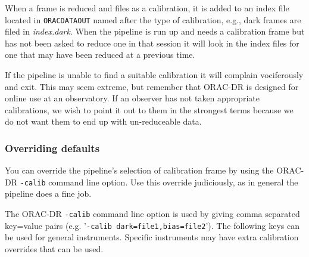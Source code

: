 \documentclass[twoside,11pt]{article}
\renewcommand{\_}{\texttt{\symbol{95}}}
\begin{document}
When a frame is reduced and files as a calibration, it is added to an
index file located in \texttt{ORAC\_DATA\_OUT} named after the type of
calibration, e.g., dark frames are filed in \emph{index.dark}.  When the
pipeline is run up and needs a calibration frame but has not been
asked to reduce one in that session it will look in the index files
for one that may have been reduced at a previous time.



If the pipeline is unable to find a suitable calibration it will
complain vociferously and exit.  This may seem extreme, but remember
that ORAC-DR is designed for online use at an observatory.  If an
observer has not taken appropriate calibrations, we wish to point it
out to them in the strongest terms because we do not want them to end
up with un-reduceable data.

\subsubsection*{Overriding defaults\label{The_ORAC-DR_Calibration_Selection_Overriding_defaults}}


You can override the pipeline's selection of calibration frame by
using the ORAC-DR \texttt{-calib} command line option.  Use this override
judiciously, as in general the pipeline does a fine job.



The ORAC-DR \texttt{-calib} command line option is used by giving comma
separated key=value pairs (e.g. '\texttt{-calib dark=file1,bias=file2}').
The following keys can be used for general instruments.  Specific
instruments may have extra calibration overrides that can be used.
\end{document}
